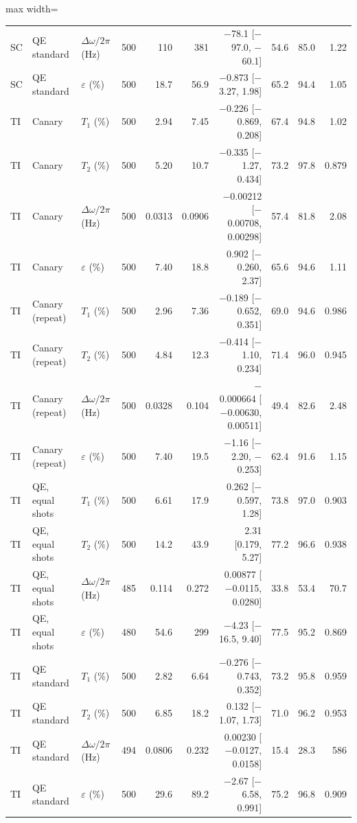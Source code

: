 \begin{table}[!t]
\begin{adjustbox}{max width=\linewidth}
\begin{tabular}{lllrrrrrrr}
SC & QE standard & $\Delta\omega/2\pi$ (Hz) & 500 & 110 & 381 & $-$78.1 [$-$97.0, $-$60.1] & 54.6 & 85.0 & 1.22 \\
SC & QE standard & $\varepsilon$ (\%) & 500 & 18.7 & 56.9 & $-$0.873 [$-$3.27, 1.98] & 65.2 & 94.4 & 1.05 \\
\hline
TI & Canary & $T_1$ (\%) & 500 & 2.94 & 7.45 & $-$0.226 [$-$0.869, 0.208] & 67.4 & 94.8 & 1.02 \\
TI & Canary & $T_2$ (\%) & 500 & 5.20 & 10.7 & $-$0.335 [$-$1.27, 0.434] & 73.2 & 97.8 & 0.879 \\
TI & Canary & $\Delta\omega/2\pi$ (Hz) & 500 & 0.0313 & 0.0906 & $-$0.00212 [$-$0.00708, 0.00298] & 57.4 & 81.8 & 2.08 \\
TI & Canary & $\varepsilon$ (\%) & 500 & 7.40 & 18.8 & 0.902 [$-$0.260, 2.37] & 65.6 & 94.6 & 1.11 \\
\hline
TI & Canary (repeat) & $T_1$ (\%) & 500 & 2.96 & 7.36 & $-$0.189 [$-$0.652, 0.351] & 69.0 & 94.6 & 0.986 \\
TI & Canary (repeat) & $T_2$ (\%) & 500 & 4.84 & 12.3 & $-$0.414 [$-$1.10, 0.234] & 71.4 & 96.0 & 0.945 \\
TI & Canary (repeat) & $\Delta\omega/2\pi$ (Hz) & 500 & 0.0328 & 0.104 & $-$0.000664 [$-$0.00630, 0.00511] & 49.4 & 82.6 & 2.48 \\
TI & Canary (repeat) & $\varepsilon$ (\%) & 500 & 7.40 & 19.5 & $-$1.16 [$-$2.20, $-$0.253] & 62.4 & 91.6 & 1.15 \\
\hline
TI & QE, equal shots & $T_1$ (\%) & 500 & 6.61 & 17.9 & 0.262 [$-$0.597, 1.28] & 73.8 & 97.0 & 0.903 \\
TI & QE, equal shots & $T_2$ (\%) & 500 & 14.2 & 43.9 & 2.31 [0.179, 5.27] & 77.2 & 96.6 & 0.938 \\
TI & QE, equal shots & $\Delta\omega/2\pi$ (Hz) & 485 & 0.114 & 0.272 & 0.00877 [$-$0.0115, 0.0280] & 33.8 & 53.4 & 70.7 \\
TI & QE, equal shots & $\varepsilon$ (\%) & 480 & 54.6 & 299 & $-$4.23 [$-$16.5, 9.40] & 77.5 & 95.2 & 0.869 \\
\hline
TI & QE standard & $T_1$ (\%) & 500 & 2.82 & 6.64 & $-$0.276 [$-$0.743, 0.352] & 73.2 & 95.8 & 0.959 \\
TI & QE standard & $T_2$ (\%) & 500 & 6.85 & 18.2 & 0.132 [$-$1.07, 1.73] & 71.0 & 96.2 & 0.953 \\
TI & QE standard & $\Delta\omega/2\pi$ (Hz) & 494 & 0.0806 & 0.232 & 0.00230 [$-$0.0127, 0.0158] & 15.4 & 28.3 & 586 \\
TI & QE standard & $\varepsilon$ (\%) & 500 & 29.6 & 89.2 & $-$2.67 [$-$6.58, 0.991] & 75.2 & 96.8 & 0.909 \\
\hline
\end{tabular}
\end{adjustbox}
\end{table}

